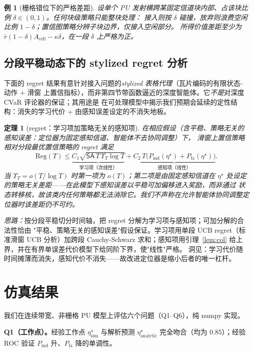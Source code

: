 \documentclass[11pt,a4paper]{article}
\newcommand{\hei}[1]{{\cjkhei #1}}
\theoremstyle{plain}
\newtheorem{theorem}{定理}
\newtheorem{example}{例}
\theoremstyle{definition}
\newcommand{\Pmd}{P_{\mathrm{md}}}
\newcommand{\Pfa}{P_{\mathrm{fa}}}
\newcommand{\thr}{\eta}
\newcommand{\bigT}{T}
\begin{document}
\begin{example}[栅格错位下的严格差距]
\label{ex:gap}
设单个 PU 发射横跨某固定信道块内部、占该块比例 $\delta\in(0,1)$。任何块级策略只能整块处理：
接入则按 $\delta$ 碰撞，放弃则浪费空闲比例 $1-\delta$；置信图策略分辨子块边界，仅接入空闲部分。
所得价值差距至少为 $\bar r(1-\delta)A_{\mathrm{cell}}-\kappa\delta$，在一段 $\delta$ 上严格为正。
\end{example}

\subsection{分段平稳动态下的 stylized regret 分析}
下面的 regret 结果有意针对接入问题的\emph{stylized 表格代理}（瓦片编码的有限状态-动作 + 滑窗
上置信指标），而非第四节带函数逼近的深度智能体。它\emph{不是}对深度 CVaR 评论器的保证；其用途是
在可处理模型中揭示我们预期会延续的定性结构：消失的学习代价 + 由感知误差设定的不消失地板。

\begin{theorem}[regret：学习项加策略无关的感知项]
\label{thm:regret}
在相应假设（含\emph{平稳、策略无关的感知误差}：定位器为固定感知信道、智能体不去协同调整）下，
滑窗上置信策略相对分段最优置信策略的 regret 满足
\[
\mathrm{Reg}(\bigT)\le
\underbrace{C_1\sqrt{\mathsf{SA}\,\bigT\,\Upsilon_\bigT\log\bigT}}_{\text{学习项（次线性）}}
+\underbrace{C_2\,\bigT\big(\Pmd(\thr^\star)+\Pfa(\thr^\star)\big)}_{\text{感知项（线性）}}.
\]
当 $\Upsilon_\bigT=o(\bigT/\log\bigT)$ 时第一项为 $o(\bigT)$；第二项是由固定感知信道在
$\thr^\star$ 处设定的\emph{策略无关}差距——在此模型下感知误差以平稳可加偏移进入奖励，而非通过
状态转移核，故该类内任何策略都无法消除它。我们不声称在允许智能体协同调整定位器时该差距仍不可约。
\end{theorem}
\noindent\emph{思路：}按分段平稳切分时间轴，把 regret 分解为学习项与感知项；可加分解的合法性恰由
"平稳、策略无关的感知误差"假设保证。学习项用单段 UCB regret（标准滑窗 UCB 分析）加跨段 Cauchy-Schwarz
求和；感知项用引理~\ref{lem:col} 给上界，并在有界单误差代价模型下给同阶下界，使"线性"严格。
洞见：学习代价随时间摊薄而消失，感知代价不消失——故改进定位器是缩小后者的唯一杠杆。

\section{仿真结果}
我们在连续带宽、非栅格 PU 模型上评估六个问题（Q1--Q6），纯 numpy 实现。

\textbf{\hei{Q1（工作点）。}}经验工作点 $\thr^\star_{\text{sim}}$ 与解析预测 $\thr^\star_{\text{analytic}}$
完全吻合（均为 $0.85$）；经验 ROC 验证 $\Pmd$ 升、$\Pfa$ 降的单调性。
\end{document}
